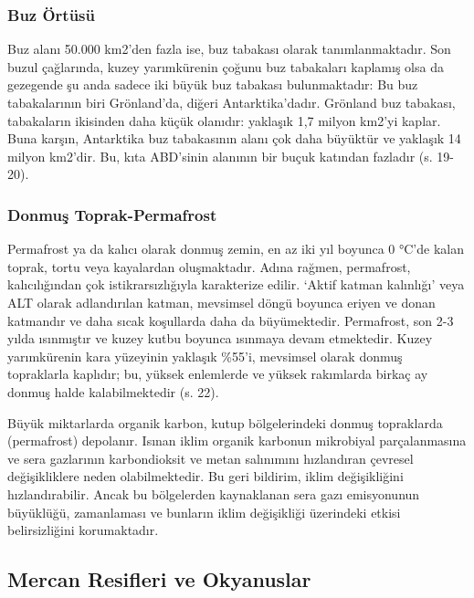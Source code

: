 \documentclass[
]{book}
\begin{document}
\hypertarget{buz-uxf6rtuxfcsuxfc}{%
\subsubsection{Buz Örtüsü}\label{buz-uxf6rtuxfcsuxfc}}

Buz alanı 50.000 km2'den fazla ise, buz tabakası olarak tanımlanmaktadır. Son buzul çağlarında, kuzey yarımkürenin çoğunu buz tabakaları kaplamış olsa da gezegende şu anda sadece iki büyük buz tabakası bulunmaktadır: Bu buz tabakalarının biri Grönland'da, diğeri Antarktika'dadır. Grönland buz tabakası, tabakaların ikisinden daha küçük olanıdır: yaklaşık 1,7 milyon km2'yi kaplar. Buna karşın, Antarktika buz tabakasının alanı çok daha büyüktür ve yaklaşık 14 milyon km2'dir. Bu, kıta ABD'sinin alanının bir buçuk katından fazladır (s. 19-20). \citep{bush2020}

\hypertarget{donmuux15f-toprak-permafrost}{%
\subsubsection{Donmuş Toprak-Permafrost}\label{donmuux15f-toprak-permafrost}}

Permafrost ya da kalıcı olarak donmuş zemin, en az iki yıl boyunca 0 °C'de kalan toprak, tortu veya kayalardan oluşmaktadır. Adına rağmen, permafrost, kalıcılığından çok istikrarsızlığıyla karakterize edilir. `Aktif katman kalınlığı' veya ALT olarak adlandırılan katman, mevsimsel döngü boyunca eriyen ve donan katmandır ve daha sıcak koşullarda daha da büyümektedir. Permafrost, son 2-3 yılda ısınmıştır ve kuzey kutbu boyunca ısınmaya devam etmektedir. Kuzey yarımkürenin kara yüzeyinin yaklaşık \%55'i, mevsimsel olarak donmuş topraklarla kaplıdır; bu, yüksek enlemlerde ve yüksek rakımlarda birkaç ay donmuş halde kalabilmektedir (s. 22). \citep{bush2020}

Büyük miktarlarda organik karbon, kutup bölgelerindeki donmuş topraklarda (permafrost) depolanır. Isınan iklim organik karbonun mikrobiyal parçalanmasına ve sera gazlarının karbondioksit ve metan salınımını hızlandıran çevresel değişikliklere neden olabilmektedir. Bu geri bildirim, iklim değişikliğini hızlandırabilir. Ancak bu bölgelerden kaynaklanan sera gazı emisyonunun büyüklüğü, zamanlaması ve bunların iklim değişikliği üzerindeki etkisi belirsizliğini korumaktadır. \citep{schuur2015climate}

\hypertarget{mercan-resifleri-ve-okyanuslar}{%
\subsection{Mercan Resifleri ve Okyanuslar}\label{mercan-resifleri-ve-okyanuslar}}
\end{document}
